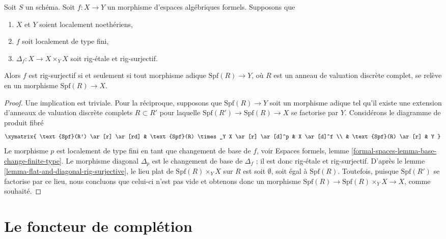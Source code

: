 \begin{lemma}
\label{lemma-rig-monomorphism-rig-surjective}
Soit $S$ un schéma. Soit $f : X \to Y$ un morphisme d'espaces algébriques
formels. Supposons que
\begin{enumerate}
\item $X$ et $Y$ soient localement noethériens,
\item $f$ soit localement de type fini,
\item $\Delta_f : X \to X \times_Y X$ soit rig-étale et rig-surjectif.
\end{enumerate}
Alors $f$ est rig-surjectif si et seulement si tout morphisme adique
$\text{Spf}(R) \to Y$, où $R$ est un anneau de valuation
discrète complet, se relève en un morphisme $\text{Spf}(R) \to X$.
\end{lemma}

\begin{proof}
Une implication est triviale. Pour la réciproque, supposons que
$\text{Spf}(R) \to Y$ soit un morphisme adique tel qu'il existe une extension
d'anneaux de valuation discrète complets $R \subset R'$ pour laquelle
$\text{Spf}(R') \to \text{Spf}(R) \to X$ se factorise par $Y$.
Considérons le diagramme de produit fibré
$$
\xymatrix{
\text{Spf}(R') \ar[r] \ar[rd] &
\text{Spf}(R) \times_Y X \ar[r] \ar[d]^p &
X \ar[d]^f \\
&
\text{Spf}(R) \ar[r] &
Y
}
$$
Le morphisme $p$ est localement de type fini en tant que changement de base de
$f$, voir Espaces formels, lemme
\ref{formal-spaces-lemma-base-change-finite-type}.
Le morphisme diagonal $\Delta_p$ est le changement de base de
$\Delta_f$ ; il est donc rig-étale et rig-surjectif.
D'après le lemme \ref{lemma-flat-and-diagonal-rig-surjective},
le lieu plat de $\text{Spf}(R) \times_Y X$ sur $R$
est soit $\emptyset$, soit égal à $\text{Spf}(R)$.
Toutefois, puisque $\text{Spf}(R')$ se factorise par ce lieu,
nous concluons que celui-ci n'est pas vide et obtenons donc
un morphisme $\text{Spf}(R) \to \text{Spf}(R) \times_Y X \to X$,
comme souhaité.
\end{proof}










\section{Le foncteur de complétion}
\label{section-completion-functor}

